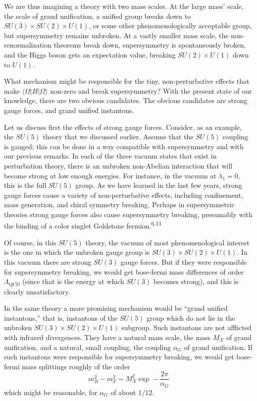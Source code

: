 We are thus imagining a theory with two mass scales. At the
large mass' scale, the scale of grand unification, a unified group
breaks down to $SU(3) \times SU(2) \times U(1)$, or some other phenomenologically
acceptable group, but supersymmetry remains unbroken. At a vastly
smaller mass scale, the non-renormalization theorems break down,
supersymmetry is spontaneously broken, and the Higgs boson gets an
expectation value, breaking $SU(2) \times U(1)$ down to $U(1)$.

What mechanism might be responsible for the tiny, non-perturbative
effects that make $\langle \Omega| H |\Omega \rangle$ non-zero and break supersymmetry?
With the present state of our knowledge, there are two obvious candidates.
The obvious candidates are strong gauge forces, and grand
unified instantons.

Let us discuss first the effects of strong gauge forces. Consider,
as an example, the $SU(5)$ theory that we discussed earlier.
Assume that the $SU(5)$ coupling is gauged; this can be done in a way
compatible with supersymmetry and with our previous remarks. In each
of the three vacuum states that exist in perturbation theory, there
is an unbroken non-Abelian interaction that will become strong at low
enough energies. For instance, in the vacuum at $\lambda_1 = 0$, this is the
full $SU(5)$ group. As we have learned in the last few years, strong
gauge forces cause a variety of non-perturbative effects, including
confinement, mass generation, and chiral symmetry breaking. Perhaps
in supersymmetric theories strong gauge forces also cause supersymmetry
breaking, presumably with the binding of a color singlet
Goldstone fermion.\textsuperscript{6,11}

Of course, in this $SU(5)$ theory, the vacuum of most phenomenological
interest is the one in which the unbroken gauge group is
$SU(3) \times SU(2) \times U(1)$. In this vacuum there are strong $SU(3)$ gauge
forces. But if they were responsible for supersymmetry breaking, we
would get bose-fermi mass differences of order $\Lambda_{\mathrm{QCD}}$ (since that is
the energy at which $SU(3)$ becomes strong), and this is clearly unsatisfactory.

In the same theory a more promising mechanism would be ``grand
unified instantons,'' that is, instantons of the $SU(5)$ group which
do not lie in the unbroken $SU(3) \times SU(2) \times U(1)$ subgroup. Such
instantons are not afflicted with infrared divergences. They have
a natural mass scale, the mass $M_X$ of grand unification, and a natural,
small coupling, the coupling $\alpha_G$ of grand unification. If such instantons
were responsible for supersymmetry breaking, we would get
bose-fermi mass splittings roughly of the order
\begin{equation}
m_B^2 - m_F^2 \sim M_X^2 \exp - \frac{2\pi}{\alpha_G}
\tag{29}
\end{equation}
which might be reasonable, for $\alpha_G$ of about $1/12$.

